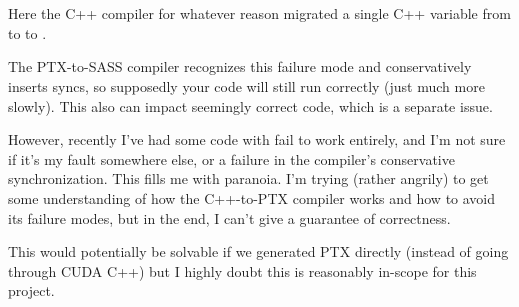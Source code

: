 \filbreak
{}\\
\\

\filbreak
Here the C++ compiler for whatever reason migrated a single C++ variable from  to  to .

\filbreak
The PTX-to-SASS compiler recognizes this failure mode and conservatively inserts syncs, so supposedly your code will still run correctly (just much more slowly).
This also can impact seemingly correct code, which is a separate issue.

\filbreak
However, recently I've had some code with fail to work entirely, and I'm not sure if it's my fault somewhere else, or a failure in the compiler's conservative synchronization.
This fills me with paranoia.
I'm trying (rather angrily) to get some understanding of how the C++-to-PTX compiler works and how to avoid its failure modes, but in the end, I can't give a guarantee of correctness.

\filbreak
This would potentially be solvable if we generated PTX directly (instead of going through CUDA C++) but I highly doubt this is reasonably in-scope for this project.


